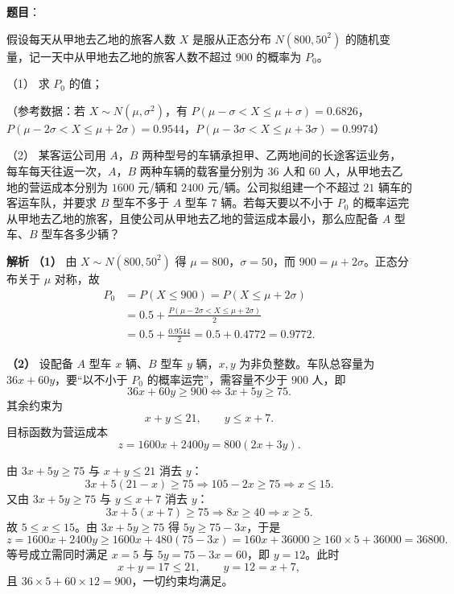 \begin{answer}

\textbf{题目}：

假设每天从甲地去乙地的旅客人数 $X$ 是服从正态分布 $N(800,50^2)$ 的随机变量，记一天中从甲地去乙地的旅客人数不超过 $900$ 的概率为 $P_0$。

（1） 求 $P_0$ 的值；

（参考数据：若 $X\sim N(\mu,\sigma^2)$，有 $P(\mu-\sigma<X\leqslant\mu+\sigma)=0.6826$，$P(\mu-2\sigma<X\leqslant\mu+2\sigma)=0.9544$，$P(\mu-3\sigma<X\leqslant\mu+3\sigma)=0.9974$）

（2） 某客运公司用 $A$，$B$ 两种型号的车辆承担甲、乙两地间的长途客运业务，每车每天往返一次，$A$，$B$ 两种车辆的载客量分别为 $36$ 人和 $60$ 人，从甲地去乙地的营运成本分别为 $1600$ 元/辆和 $2400$ 元/辆。公司拟组建一个不超过 $21$ 辆车的客运车队，并要求 $B$ 型车不多于 $A$ 型车 $7$ 辆。若每天要以不小于 $P_0$ 的概率运完从甲地去乙地的旅客，且使公司从甲地去乙地的营运成本最小，那么应配备 $A$ 型车、$B$ 型车各多少辆？

\textbf{解析}
\textbf{（1）} 由 $X\sim N(800,50^2)$ 得 $\mu=800$，$\sigma=50$，而 $900=\mu+2\sigma$。正态分布关于 $\mu$ 对称，故
\nopagebreak[4]
\[\begin{aligned}
P_0&=P(X\leqslant900)=P(X\leqslant\mu+2\sigma)\\
&=0.5+\frac{P(\mu-2\sigma<X\leqslant\mu+2\sigma)}{2}\\
&=0.5+\frac{0.9544}{2}=0.5+0.4772=0.9772.
\end{aligned}\]

\textbf{（2）} 设配备 $A$ 型车 $x$ 辆、$B$ 型车 $y$ 辆，$x,y$ 为非负整数。车队总容量为 $36x+60y$，要“以不小于 $P_0$ 的概率运完”，需容量不少于 $900$ 人，即
\nopagebreak[4]
\[36x+60y\geqslant900\iff3x+5y\geqslant75.\]
其余约束为
\nopagebreak[4]
\[x+y\leqslant21,\qquad y\leqslant x+7.\]
目标函数为营运成本
\nopagebreak[4]
\[z=1600x+2400y=800(2x+3y).\]

由 $3x+5y\geqslant75$ 与 $x+y\leqslant21$ 消去 $y$：
\nopagebreak[4]
\[3x+5(21-x)\geqslant75\Longrightarrow105-2x\geqslant75\Longrightarrow x\leqslant15.\]
又由 $3x+5y\geqslant75$ 与 $y\leqslant x+7$ 消去 $y$：
\nopagebreak[4]
\[3x+5(x+7)\geqslant75\Longrightarrow8x\geqslant40\Longrightarrow x\geqslant5.\]
故 $5\leqslant x\leqslant15$。由 $3x+5y\geqslant75$ 得 $5y\geqslant75-3x$，于是
\nopagebreak[4]
\[z=1600x+2400y\geqslant1600x+480(75-3x)=160x+36000\geqslant160\times5+36000=36800.\]
等号成立需同时满足 $x=5$ 与 $5y=75-3x=60$，即 $y=12$。此时
\nopagebreak[4]
\[x+y=17\leqslant21,\qquad y=12=x+7,\]
且 $36\times5+60\times12=900$，一切约束均满足。


\end{answer}
